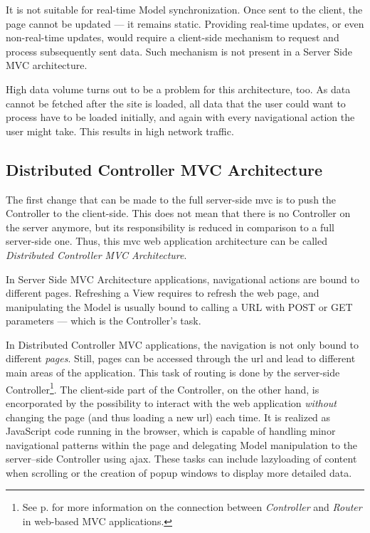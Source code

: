 It is not suitable for real-time Model synchronization. Once sent to the client, the page cannot be updated --- it remains static. Providing real-time updates, or even non-real-time updates, would require a client-side mechanism to request and process subsequently sent data. Such mechanism is not present in a Server Side MVC architecture.

High data volume turns out to be a problem for this architecture, too. As data cannot be fetched after the site is loaded, all data that the user could want to process have to be loaded initially, and again with every navigational action the user might take. This results in high network traffic.

\newpage
\subsection{Distributed Controller MVC Architecture}
\label{sec:distcontr}
The first change that can be made to the full server-side \ac{mvc} is to push the Controller to the client-side. This does not mean that there is no Controller on the server anymore, but its responsibility is reduced in comparison to a full server-side one. Thus, this \ac{mvc} web application architecture can be called \emph{Distributed Controller MVC Architecture}.

In Server Side MVC Architecture applications, navigational actions are bound to different pages. Refreshing a View requires to refresh the web page, and manipulating the Model is usually bound to calling a URL with POST or GET parameters --- which is the Controller's task.

In Distributed Controller MVC applications, the navigation is not only bound to different \emph{pages}. Still, pages can be accessed through the \ac{url} and lead to different main areas of the application. This task of routing is done by the server-side Controller\footnote{See p. \pageref{term:router} for more information on the connection between \emph{Controller} and \emph{Router} in web-based MVC applications.}.
The client-side part of the Controller, on the other hand, is encorporated by the possibility to interact with the web application \emph{without} changing the page (and thus loading a new \ac{url}) each time. It is realized as JavaScript code running in the browser, which is capable of handling minor navigational patterns within the page and delegating Model manipulation to the server--side Controller using \ac{ajax}. These tasks can include \gls{lazyloading} of content when scrolling or the creation of popup windows to display more detailed data.

